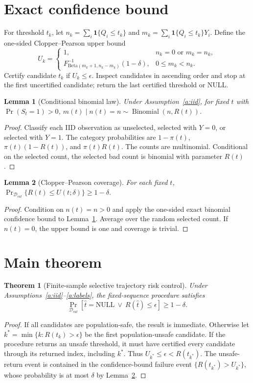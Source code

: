 \documentclass{article}
\newtheorem{lemma}{Lemma}[section]
\newtheorem{theorem}{Theorem}[section]
\begin{document}
\section{Exact confidence bound}
For threshold $t_k$, let $n_k=\sum_i\mathbf 1\{Q_i\le t_k\}$ and $m_k=\sum_i\mathbf 1\{Q_i\le t_k\}Y_i$. Define the one-sided Clopper--Pearson upper bound
\[
U_k=\begin{cases}1,&n_k=0\text{ or }m_k=n_k,\\ F^{-1}_{\mathrm{Beta}(m_k+1,n_k-m_k)}(1-\delta),&0\le m_k<n_k.\end{cases}
\]
Certify candidate $t_k$ if $U_k\le\epsilon$. Inspect candidates in ascending order and stop at the first uncertified candidate; return the last certified threshold or NULL.
\begin{lemma}[Conditional binomial law]\label{l:bin} Under Assumption~\ref{a:iid}, for fixed $t$ with $\Pr(S_t=1)>0$, $m(t)\mid n(t)=n\sim\operatorname{Binomial}(n,R(t))$.\end{lemma}
\begin{proof} Classify each IID observation as unselected, selected with $Y=0$, or selected with $Y=1$. The category probabilities are $1-\pi(t)$, $\pi(t)(1-R(t))$, and $\pi(t)R(t)$. The counts are multinomial. Conditional on the selected count, the selected bad count is binomial with parameter $R(t)$.\end{proof}
\begin{lemma}[Clopper--Pearson coverage]\label{l:cp} For each fixed $t$, $\Pr_{\mathcal D_{cal}}\{R(t)\le U(t;\delta)\}\ge1-\delta$.\end{lemma}
\begin{proof} Condition on $n(t)=n>0$ and apply the one-sided exact binomial confidence bound to Lemma~\ref{l:bin}. Average over the random selected count. If $n(t)=0$, the upper bound is one and coverage is trivial.\end{proof}
\section{Main theorem}
\begin{theorem}[Finite-sample selective trajectory risk control]\label{thm:risk} Under Assumptions~\ref{a:iid}--\ref{a:labels}, the fixed-sequence procedure satisfies
\[
\Pr_{\mathcal D_{cal}}\left[\hat t=\mathrm{NULL}\ \lor\ R(\hat t)\le\epsilon\right]\ge1-\delta.
\]
\end{theorem}
\begin{proof} If all candidates are population-safe, the result is immediate. Otherwise let $k^*=\min\{k:R(t_k)>\epsilon\}$ be the first population-unsafe candidate. If the procedure returns an unsafe threshold, it must have certified every candidate through its returned index, including $k^*$. Thus $U_{k^*}\le\epsilon<R(t_{k^*})$. The unsafe-return event is contained in the confidence-bound failure event $\{R(t_{k^*})>U_{k^*}\}$, whose probability is at most $\delta$ by Lemma~\ref{l:cp}.\end{proof}
\end{document}
